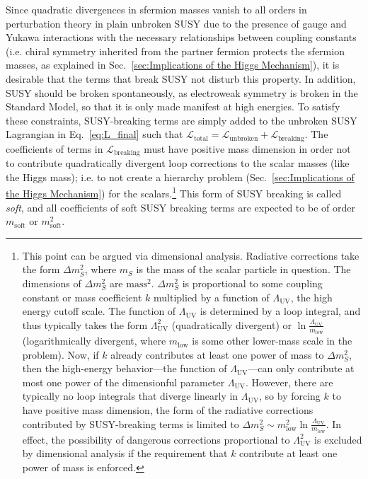 \documentclass[dissertation.tex]{subfiles}
\begin{document}
Since quadratic divergences in sfermion masses vanish to all orders in perturbation theory in plain unbroken SUSY \cite{SUSY_primer} due to the presence of gauge and Yukawa interactions with the necessary relationships between coupling constants (i.e. chiral symmetry inherited from the partner fermion protects the sfermion masses, as explained in Sec.~\ref{sec:Implications of the Higgs Mechanism}), it is desirable that the terms that break SUSY not disturb this property.  In addition, SUSY should be broken spontaneously, as electroweak symmetry is broken in the Standard Model, so that it is only made manifest at high energies.  To satisfy these constraints, SUSY-breaking terms are simply added to the unbroken SUSY Lagrangian in Eq.~\ref{eq:L_final} such that $\mathcal{L}_{\mathrm{total}} = \mathcal{L}_{\mathrm{unbroken}} + \mathcal{L}_{\mathrm{breaking}}$.  The coefficients of terms in $\mathcal{L}_{\mathrm{breaking}}$ must have positive mass dimension in order not to contribute quadratically divergent loop corrections to the scalar masses (like the Higgs mass); i.e. to not create a hierarchy problem (Sec.~\ref{sec:Implications of the Higgs Mechanism}) for the scalars.\footnote{This point can be argued via dimensional analysis.  Radiative corrections take the form $\Delta m_{S}^{2}$, where $m_{S}$ is the mass of the scalar particle in question.  The dimensions of $\Delta m_{S}^{2}$ are $\mbox{mass}^{2}$.  $\Delta m_{S}^{2}$ is proportional to some coupling constant or mass coefficient $k$ multiplied by a function of $\Lambda_{\mathrm{UV}}$, the high energy cutoff scale.  The function of $\Lambda_{\mathrm{UV}}$ is determined by a loop integral, and thus typically takes the form $\Lambda_{\mathrm{UV}}^{2}$ (quadratically divergent) or $\ln\frac{\Lambda_{\mathrm{UV}}}{m_{\mathrm{low}}}$ (logarithmically divergent, where $m_{\mathrm{low}}$ is some other lower-mass scale in the problem).  Now, if $k$ already contributes at least one power of mass to $\Delta m_{S}^{2}$, then the high-energy behavior---the function of $\Lambda_{\mathrm{UV}}$---can only contribute at most one power of the dimensionful parameter $\Lambda_{\mathrm{UV}}$.  However, there are typically no loop integrals that diverge linearly in $\Lambda_{\mathrm{UV}}$, so by forcing $k$ to have positive mass dimension, the form of the radiative corrections contributed by SUSY-breaking terms is limited to $\Delta m_{S}^{2} \sim m_{\mathrm{low}}^{2}\ln\frac{\Lambda_{\mathrm{UV}}}{m_{\mathrm{low}}}$.  In effect, the possibility of dangerous corrections proportional to $\Lambda_{\mathrm{UV}}^{2}$ is excluded by dimensional analysis if the requirement that $k$ contribute at least one power of mass is enforced.}  This form of SUSY breaking is called \textit{soft}, and all coefficients of soft SUSY breaking terms are expected to be of order $m_{\mathrm{soft}}$ or $m_{\mathrm{soft}}^{2}$.
\end{document}
